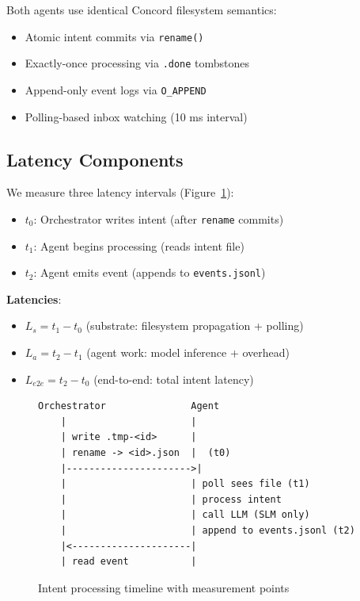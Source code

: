 \documentclass[11pt]{article}
\begin{document}
Both agents use identical Concord filesystem semantics:
\begin{itemize}
\item Atomic intent commits via \texttt{rename()}
\item Exactly-once processing via \texttt{.done} tombstones
\item Append-only event logs via \texttt{O\_APPEND}
\item Polling-based inbox watching (10 ms interval)
\end{itemize}

\subsection{Latency Components}

We measure three latency intervals (Figure~\ref{fig:timeline}):

\begin{itemize}
\item $t_0$: Orchestrator writes intent (after \texttt{rename} commits)
\item $t_1$: Agent begins processing (reads intent file)
\item $t_2$: Agent emits event (appends to \texttt{events.jsonl})
\end{itemize}

\textbf{Latencies}:
\begin{itemize}
\item $L_s = t_1 - t_0$ (substrate: filesystem propagation + polling)
\item $L_a = t_2 - t_1$ (agent work: model inference + overhead)
\item $L_{e2e} = t_2 - t_0$ (end-to-end: total intent latency)
\end{itemize}

\begin{figure}[h]
\centering
\begin{verbatim}
Orchestrator               Agent                     
    |                      |                         
    | write .tmp-<id>      |                         
    | rename -> <id>.json  |  (t0)                   
    |---------------------->|                         
    |                      | poll sees file (t1)     
    |                      | process intent          
    |                      | call LLM (SLM only)     
    |                      | append to events.jsonl (t2)
    |<---------------------|                         
    | read event           |                         
\end{verbatim}
\caption{Intent processing timeline with measurement points}
\label{fig:timeline}
\end{figure}
\end{document}

